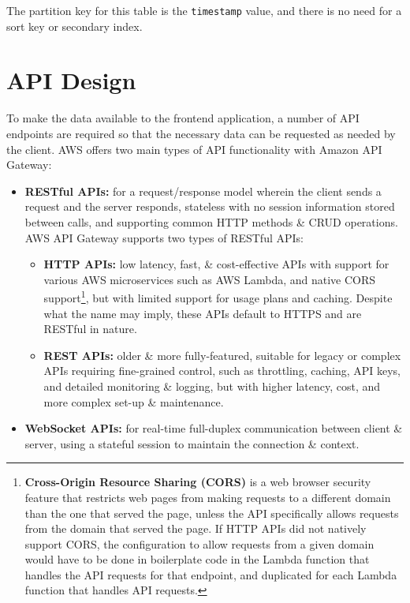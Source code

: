 \documentclass[a4paper,11pt]{report}
\begin{document}
The partition key for this table is the \verb|timestamp| value, and there is no need for a sort key or secondary index.

\section{API Design}
To make the data available to the frontend application, a number of API endpoints are required so that the necessary data can be requested as needed by the client.
AWS offers two main types of API functionality with Amazon API Gateway\supercite{awsapi}:
\begin{itemize}
    \item   \textbf{RESTful APIs:} for a request/response model wherein the client sends a request and the server responds, stateless with no session information stored between calls, and supporting common HTTP methods \& CRUD operations.
          AWS API Gateway supports two types of RESTful APIs\supercite{httpvsrest}:
          \begin{itemize}
              \item   \textbf{HTTP APIs:} low latency, fast, \& cost-effective APIs with support for various AWS microservices such as AWS Lambda, and native CORS support\footnote{\textbf{Cross-Origin Resource Sharing (CORS)} is a web browser security feature that restricts web pages from making requests to a different domain than the one that served the page, unless the API specifically allows requests from the domain that served the page\supercite{w3c-cors}. If HTTP APIs did not natively support CORS, the configuration to allow requests from a given domain would have to be done in boilerplate code in the Lambda function that handles the API requests for that endpoint, and duplicated for each Lambda function that handles API requests.}, but with limited support for usage plans and caching. Despite what the name may imply, these APIs default to HTTPS and are RESTful in nature.
              \item   \textbf{REST APIs:} older \& more fully-featured, suitable for legacy or complex APIs requiring fine-grained control, such as throttling, caching, API keys, and detailed monitoring \& logging, but with higher latency, cost, and more complex set-up \& maintenance.
          \end{itemize}

    \item   \textbf{WebSocket APIs:} for real-time full-duplex communication between client \& server, using a stateful session to maintain the connection \& context.
\end{itemize}
\end{document}

